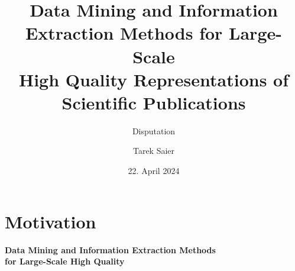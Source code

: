 \documentclass[en,16:9,smallfoot]{sdqbeamer}
\title[Data Mining and Information Extraction Methods for Better Scholarly Data]{Data Mining and Information Extraction Methods for Large-Scale\\High Quality Representations of Scientific Publications}
\subtitle{Disputation}
\author{Tarek Saier}
\date[22.\,04.\,2024]{22. April 2024}
\begin{document}
\KITtitleframe


\section{Motivation}

   \begin{frame}[plain]
        \vspace{1cm}
        \centering
        \begin{Large}
        {\color{lightgrey}\textbf{Data Mining and Information Extraction Methods}}\\
        \vspace{0.25em}
        {\color{lightgrey}\textbf{for Large-Scale High Quality}}\\
        \vspace{0.5em}
        {\textbf{
        }}
        \end{Large}
   \end{frame}
\end{document}
